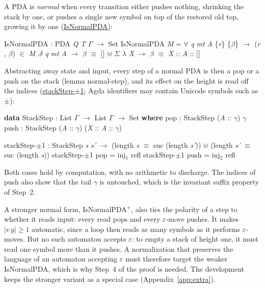 \documentclass[runningheads]{llncs}
\newcommand{\blueFG}[1]{\textcolor[rgb]{0,0,0.8}{#1}}
\newcommand{\redFG}[1]{\textcolor[rgb]{0.6,0,0}{#1}}
\newcommand{\greenFG}[1]{\textcolor[rgb]{0,0.4,0}{#1}}
\newcommand{\purpleFG}[1]{\textcolor[rgb]{0.4,0,0.4}{#1}}
\newcommand{\D}[1]{{\blueFG{\textsf{#1}}}}      %
\newcommand{\Con}[1]{{\redFG{\textsf{#1}}}}     %
\newcommand{\F}[1]{{\greenFG{\textsf{#1}}}}     %
\newcommand{\V}[1]{{\purpleFG{\textit{#1}}}}    %
\newcommand{\Kw}[1]{\textbf{#1}}                %
\newcommand{\agdarev}{9ac99a00bb1dc0047eca6ac9ab8f15585acb3577}
\newcommand{\agdarepo}{https://github.com/lives-group/pda-pumping/blob/\agdarev/src}
\newcommand{\agdalink}[3]{\href{\agdarepo/#1\#L#2}{\F{#3}}}
\newcommand{\kto}{\ensuremath{\to}}
\newcommand{\kuplus}{\ensuremath{\uplus}}
\newcommand{\kfa}{\ensuremath{\forall}}
\newcommand{\kin}{\ensuremath{\in}}
\newcommand{\keq}{\ensuremath{\equiv}}
\newcommand{\ks}[1]{\ensuremath{_{#1}}}
\newcommand{\kp}[1]{\ensuremath{^{#1}}}
\newcommand{\kla}{\ensuremath{\lambda}}
\newcommand{\kSigma}{\ensuremath{\Sigma}}
\newcommand{\kb}{\ensuremath{\beta}}
\newcommand{\kG}{\ensuremath{\Gamma}}   %
\newcommand{\kg}{\ensuremath{\gamma}}   %
\newcommand{\kd}{\ensuremath{\delta}}
\begin{document}
A PDA is \emph{normal} when every transition either pushes nothing, shrinking
the stack by one, or pushes a single new symbol on top of the restored old top,
growing it by one (\agdalink{PDA/Normal.agda}{24}{IsNormalPDA}):
\begin{spec}
\F{IsNormalPDA} : \D{PDA} \V{Q} \V{T} \V{\kG{}} \kto{} \D{Set}
\F{IsNormalPDA} \V{M} = \kfa{} \V{q} \V{mt} \V{A} \{\V{r}\} \{\V{\kb{}}\}
   \kto{} (\V{r} , \V{\kb{}}) \kin{} \V{M} \F{.\kd{}} \V{q} \V{mt} \V{A} \kto{} \V{\kb{}} \keq{} [] \kuplus{} \D{\kSigma{}} \kla{} \V{X} \kto{} \V{\kb{}} \keq{} \V{X} :: \V{A} :: []
\end{spec}
Abstracting away state and input, every step of a normal PDA is then a
\Con{pop} or a \Con{push} on the stack (lemma \F{normal-step}), and its effect on
the height is read off the indices
(\agdalink{PDA/Normal.agda}{78}{stackStep-\ensuremath{\pm}1}; Agda identifiers
may contain Unicode symbols such as $\pm$):
\begin{spec}
\Kw{data} \D{StackStep} : \D{List} \V{\kG{}} \kto{} \D{List} \V{\kG{}} \kto{} \D{Set} \Kw{where}
   \Con{pop}  : \D{StackStep} (\V{A} :: \V{\kg{}}) \V{\kg{}}
   \Con{push} : \D{StackStep} (\V{A} :: \V{\kg{}}) (\V{X} :: \V{A} :: \V{\kg{}})

\F{stackStep-\ensuremath{\pm}1} : \D{StackStep} \V{s} \V{s'}
   \kto{} (\F{length} \V{s} \keq{} \Con{suc} (\F{length} \V{s'})) \kuplus{} (\F{length} \V{s'} \keq{} \Con{suc} (\F{length} \V{s}))
\F{stackStep-\ensuremath{\pm}1} \Con{pop}  = \Con{inj\ks{1}} \Con{refl}
\F{stackStep-\ensuremath{\pm}1} \Con{push} = \Con{inj\ks{2}} \Con{refl}
\end{spec}
Both cases hold by computation, with no arithmetic to discharge. The indices of
\Con{push} also show that the tail $\kg$ is untouched, which is the invariant
suffix property of Step~2.

A stronger normal form, \D{IsNormalPDA\kp{+}}, also ties the polarity of a step
to whether it reads input: every read pops and every $\varepsilon$-move pushes.
It makes $|v\,y| \geq 1$ automatic, since a loop then reads as many symbols as it
performs $\varepsilon$-moves. But no such automaton accepts $\varepsilon$: to
empty a stack of height one, it must read one symbol more than it pushes. A
normalization that preserves the language of an automaton accepting
$\varepsilon$ must therefore target the weaker \F{IsNormalPDA}, which is why
Step~4 of the proof is needed. The development keeps the stronger variant as a
special case (Appendix~\ref{app:extra}).
\end{document}
